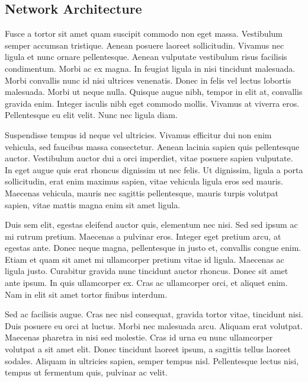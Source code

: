 \subsection{Network Architecture} %
\label{sub:Network Architecture_2}
Fusce a tortor sit amet quam suscipit commodo non eget massa. Vestibulum semper accumsan tristique. Aenean posuere laoreet sollicitudin. Vivamus nec ligula et nunc ornare pellentesque. Aenean vulputate vestibulum risus facilisis condimentum. Morbi ac ex magna. In feugiat ligula in nisi tincidunt malesuada. Morbi convallis nunc id nisi ultrices venenatis. Donec in felis vel lectus lobortis malesuada. Morbi ut neque nulla. Quisque augue nibh, tempor in elit at, convallis gravida enim. Integer iaculis nibh eget commodo mollis. Vivamus at viverra eros. Pellentesque eu elit velit. Nunc nec ligula diam.

Suspendisse tempus id neque vel ultricies. Vivamus efficitur dui non enim vehicula, sed faucibus massa consectetur. Aenean lacinia sapien quis pellentesque auctor. Vestibulum auctor dui a orci imperdiet, vitae posuere sapien vulputate. In eget augue quis erat rhoncus dignissim ut nec felis. Ut dignissim, ligula a porta sollicitudin, erat enim maximus sapien, vitae vehicula ligula eros sed mauris. Maecenas vehicula, mauris nec sagittis pellentesque, mauris turpis volutpat sapien, vitae mattis magna enim sit amet ligula.

Duis sem elit, egestas eleifend auctor quis, elementum nec nisi. Sed sed ipsum ac mi rutrum pretium. Maecenas a pulvinar eros. Integer eget pretium arcu, at egestas ante. Donec neque magna, pellentesque in justo et, convallis congue enim. Etiam et quam sit amet mi ullamcorper pretium vitae id ligula. Maecenas ac ligula justo. Curabitur gravida nunc tincidunt auctor rhoncus. Donec sit amet ante ipsum. In quis ullamcorper ex. Cras ac ullamcorper orci, et aliquet enim. Nam in elit sit amet tortor finibus interdum.

Sed ac facilisis augue. Cras nec nisl consequat, gravida tortor vitae, tincidunt nisi. Duis posuere eu orci at luctus. Morbi nec malesuada arcu. Aliquam erat volutpat. Maecenas pharetra in nisi sed molestie. Cras id urna eu nunc ullamcorper volutpat a sit amet elit. Donec tincidunt laoreet ipsum, a sagittis tellus laoreet sodales. Aliquam in ultricies sapien, semper tempus nisl. Pellentesque lectus nisi, tempus ut fermentum quis, pulvinar ac velit.

